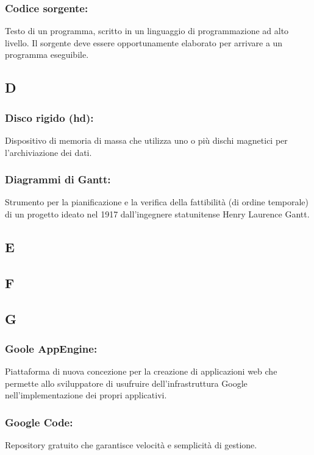 \subsubsection*{Codice sorgente:} Testo di un programma, scritto in un
linguaggio di programmazione ad alto livello. Il sorgente deve essere opportunamente elaborato
per arrivare a un programma eseguibile.

\subsection*{\huge{D}}
\subsubsection*{Disco rigido (hd):} Dispositivo di memoria di massa che utilizza
uno o pi\`u dischi magnetici per l'archiviazione dei dati.

\subsubsection*{Diagrammi di Gantt:} Strumento per la pianificazione e la
verifica della fattibilit\`a (di ordine temporale) di un progetto ideato nel 1917 dall'ingegnere
statunitense Henry Laurence Gantt.
\subsection*{\huge{E}}
\subsection*{\huge{F}}
\subsection*{\huge{G}}

\subsubsection*{Goole AppEngine:} Piattaforma di nuova concezione per
la creazione di applicazioni web che permette allo sviluppatore di usufruire dell'infrastruttura
Google nell'implementazione dei propri applicativi.

\subsubsection*{Google Code:} Repository gratuito che garantisce
velocit\`a e semplicit\`a di gestione.


